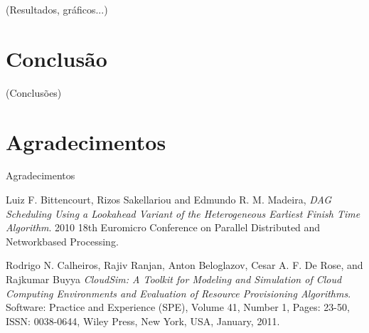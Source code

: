 \documentclass[a4paper,10pt]{article}
\begin{document}
(Resultados, gráficos...)

\section{Conclusão}

(Conclusões)

\section{Agradecimentos}

Agradecimentos

\begin{thebibliography}{9}

  Luiz F. Bittencourt, Rizos Sakellariou and Edmundo R. M. Madeira,
  \emph{DAG Scheduling Using a Lookahead Variant
of the Heterogeneous Earliest Finish Time Algorithm}.
  2010 18th Euromicro Conference on Parallel Distributed and Networkbased Processing.

  Rodrigo N. Calheiros, Rajiv Ranjan, Anton Beloglazov, Cesar A. F. De Rose, and Rajkumar Buyya
  \emph{CloudSim: A Toolkit for Modeling and Simulation of Cloud Computing Environments and Evaluation of Resource Provisioning Algorithms}.
  Software: Practice and Experience (SPE),
  Volume 41, Number 1, Pages: 23-50, ISSN: 0038-0644,
  Wiley Press, New York, USA, January, 2011.

 

\end{thebibliography}
\end{document}
